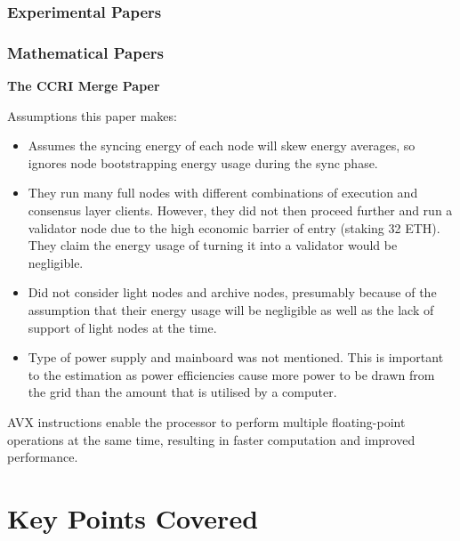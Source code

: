 
\subsubsection{Experimental Papers}




\subsubsection{Mathematical Papers}




\textbf{The CCRI Merge Paper } \cite{CCRI:Network}

Assumptions this paper makes:
\begin{itemize}
    \item Assumes the syncing energy of each node will skew energy averages, so ignores node bootstrapping energy usage during the sync phase.
    
    \item They run many full nodes with different combinations of execution and consensus layer clients. However, they did not then proceed further and run a validator node due to the high economic barrier of entry (staking 32 ETH). They claim the energy usage of turning it into a validator would be negligible.
    
    \item Did not consider light nodes and archive nodes, presumably because of the assumption that their energy usage will be negligible as well as the lack of support of light nodes at the time.

    \item Type of power supply and mainboard was not mentioned. This is important to the estimation as power efficiencies cause more power to be drawn from the grid than the amount that is utilised by a computer.
\end{itemize}



AVX instructions enable the processor to perform multiple floating-point operations at the same time, resulting in faster computation and improved performance. \cite{Schuchart2016TheScale}



\section{Key Points Covered}
